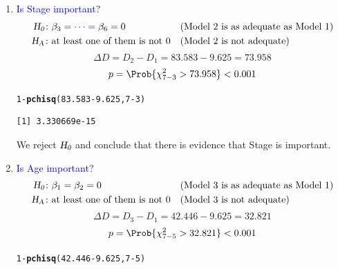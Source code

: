 \documentclass[oneside]{book}\usepackage[]{graphicx}\usepackage[svgnames]{xcolor}
\makeatletter
\newcommand{\hlnum}[1]{\textcolor[rgb]{0.686,0.059,0.569}{#1}}%
\newcommand{\hlopt}[1]{\textcolor[rgb]{0,0,0}{#1}}%
\newcommand{\hlstd}[1]{\textcolor[rgb]{0.345,0.345,0.345}{#1}}%
\newcommand{\hlkwd}[1]{\textcolor[rgb]{0.737,0.353,0.396}{\textbf{#1}}}%
\newenvironment{kframe}{%
 \def\at@end@of@kframe{}%
 \ifinner\ifhmode%
  \def\at@end@of@kframe{\end{minipage}}%
  \begin{minipage}{\columnwidth}%
 \fi\fi%
 \def\FrameCommand##1{\hskip\@totalleftmargin \hskip-\fboxsep
 \colorbox{shadecolor}{##1}\hskip-\fboxsep
     \hskip-\linewidth \hskip-\@totalleftmargin \hskip\columnwidth}%
 \MakeFramed {\advance\hsize-\width
   \@totalleftmargin\z@ \linewidth\hsize
   \@setminipage}}%
 {\par\unskip\endMakeFramed%
 \at@end@of@kframe}
\newenvironment{knitrout}{}{} %
\newcommand{\HN}{\textsl{H}_{\textsl{0}}}%
\newcommand{\HA}{\textsl{H}_{\textsl{A}}}%
\makeatother
\begin{document}
\begin{enumerate}[1.]
    \item \textcolor{Blue}{Is Stage important?}
          \begin{align*}
              \HN & \colon \beta_3=\cdots=\beta_6=0             &  & \text{(Model 2 is as adequate as Model 1)} \\
              \HA & \colon \text{at least one of them is not 0} &  & \text{(Model 2 is not adequate)}
          \end{align*}
          \[ \Delta D=D_2-D_1=83.583-9.625=73.958 \]
          \[ p=\Prob{\chi^2_{7-3}>73.958}<0.001 \]
\begin{knitrout}
\color{fgcolor}\begin{kframe}
\begin{alltt}
\hlnum{1} \hlopt{-} \hlkwd{pchisq}\hlstd{(}\hlnum{83.583} \hlopt{-} \hlnum{9.625}\hlstd{,} \hlnum{7} \hlopt{-} \hlnum{3}\hlstd{)}
\end{alltt}
\begin{verbatim}
[1] 3.330669e-15
\end{verbatim}
\end{kframe}
\end{knitrout}
          We reject $ \HN $ and conclude that there is evidence that Stage is important.
    \item \textcolor{Blue}{Is Age important?}
          \begin{align*}
              \HN & \colon \beta_1=\beta_2=0                    &  & \text{(Model 3 is as adequate as Model 1)} \\
              \HA & \colon \text{at least one of them is not 0} &  & \text{(Model 3 is not adequate)}
          \end{align*}
          \[ \Delta D=D_3-D_1=42.446 - 9.625 = 32.821 \]
          \[ p=\Prob{\chi^2_{7-5}>32.821}<0.001 \]
\begin{knitrout}
\color{fgcolor}\begin{kframe}
\begin{alltt}
\hlnum{1} \hlopt{-} \hlkwd{pchisq}\hlstd{(}\hlnum{42.446} \hlopt{-} \hlnum{9.625}\hlstd{,} \hlnum{7} \hlopt{-} \hlnum{5}\hlstd{)}
\end{alltt}
\begin{verbatim}

\end{verbatim}
\end{kframe}
\end{knitrout}
\end{enumerate}
\end{document}
